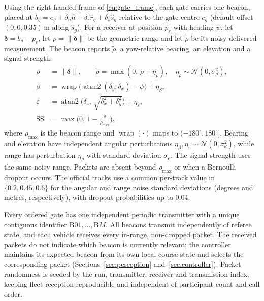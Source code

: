 Using the right-handed frame of \eqref{eq:gate_frame}, each gate carries one
beacon, placed at
$b_g=c_g+\delta_n \hat{n}+\delta_r \hat{r}_g+\delta_s \hat{s}_g$ relative to the
gate centre $c_g$ (default offset $(0,0,0.35)$\,m along $\hat{s}_g$). For a
receiver at position $p_r$ with heading $\psi$, let $\boldsymbol{\delta}=b_g-p_r$,
let $\rho=\lVert\boldsymbol{\delta}\rVert$ be the geometric range and let
$\tilde{\rho}$ be its noisy delivered measurement. The beacon reports
$\tilde{\rho}$, a yaw-relative bearing, an elevation and a signal strength:
\begin{align}
\label{eq:beacon}
\rho &= \lVert\boldsymbol{\delta}\rVert,\qquad \tilde{\rho}=\max(0,\,\rho+\eta_\rho),\quad \eta_\rho\sim\mathcal{N}(0,\sigma_\rho^2),\\
\beta &= \operatorname{wrap}\!\big(\operatorname{atan2}(\delta_y,\delta_x)-\psi\big)+\eta_\beta,\\
\varepsilon &= \operatorname{atan2}\!\big(\delta_z,\,\textstyle\sqrt{\delta_x^2+\delta_y^2}\big)+\eta_\varepsilon,\\
\mathrm{SS} &= \max\!\Big(0,\,1-\tfrac{\tilde{\rho}}{\rho_{\max}}\Big),\nonumber
\end{align}
where $\rho_{\max}$ is the beacon range and $\operatorname{wrap}(\cdot)$ maps to
$(-180^\circ,180^\circ]$. Bearing and elevation have independent angular
perturbations $\eta_\beta,\eta_\varepsilon\sim\mathcal{N}(0,\sigma_\theta^2)$,
while range has perturbation $\eta_\rho$ with standard deviation $\sigma_\rho$.
The signal strength uses the same noisy range. Packets are absent beyond
$\rho_{\max}$ or when a Bernoulli dropout occurs. The official tracks use a
common per-track value in $\{0.2,0.45,0.6\}$ for the angular and range noise
standard deviations (degrees and metres, respectively), with dropout
probabilities up to $0.04$.

Every ordered gate has one independent periodic transmitter with a unique
contiguous identifier $\mathrm{B01},\ldots,\mathrm{B}M$. All beacons transmit
independently of referee state, and each vehicle receives every in-range,
non-dropped packet. The received packets do not indicate which beacon is
currently relevant; the controller maintains its expected beacon from its own
local course state and selects the corresponding packet
(Sections~\ref{sec:perception} and~\ref{sec:controller}). Packet randomness is
seeded by the run, transmitter, receiver and transmission index, keeping fleet
reception reproducible and independent of participant count and call order.

